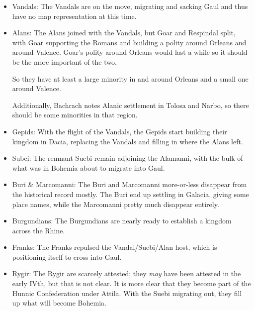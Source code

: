\documentclass{article}
\begin{document}
\begin{itemize}
		\item Vandals:\newline
		The Vandals are on the move, migrating and sacking Gaul and thus have no map representation at this time.
		
		\item Alans:\newline
		The Alans joined with the Vandals, but Goar and Respindal split, with Goar supporting the Romans and building a polity around Orleans and around Valence.
		Goar's polity around Orleans would last a while so it should be the more important of the two.
		
		So they have at least a large minority in and around Orleans and a small one around Valence.
		
		Additionally, Bachrach notes Alanic settlement in Tolosa and Narbo, so there should be some minorities in that region.
		
		\item Gepids:\newline
		With the flight of the Vandals, the Gepids start building their kingdom in Dacia, replacing the Vandals and filling in where the Alans left.
		
		\item Subei:\newline
		The remnant Suebi remain adjoining the Alamanni, with the bulk of what was in Bohemia about to migrate into Gaul.
		
		\item Buri \& Marcomanni:\newline
		The Buri and Marcomanni more-or-less disappear from the historical record mostly.
		The Buri end up settling in Galacia, giving some place names, while the Marcomanni pretty much disappear entirely.
		
		\item Burgundians:\newline
		The Burgundians are nearly ready to establish a kingdom across the Rhine.
		
		\item Franks:\newline
		The Franks repulsed the Vandal/Suebi/Alan host, which is positioning itself to cross into Gaul.
		
		\item Rygir:\newline
		The Rygir are scarcely attested; they \textit{may} have been attested in the early IVth, but that is not clear.
		It is more clear that they become part of the Hunnic Confederation under Attila.
		With the Suebi migrating out, they fill up what will become Bohemia.
		

\end{itemize}
\end{document}
